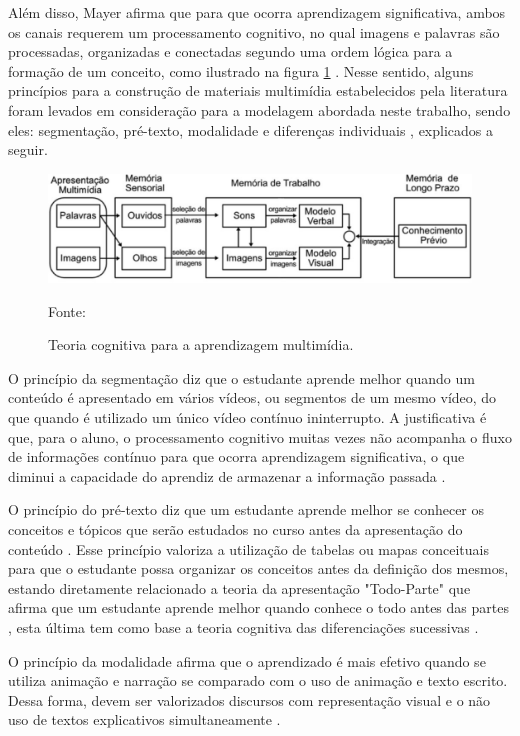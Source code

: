 Além disso, Mayer afirma que para que ocorra aprendizagem significativa, ambos os canais requerem um processamento cognitivo, no qual imagens e palavras são processadas, organizadas e conectadas segundo uma ordem lógica para a formação de um conceito, como ilustrado na figura \ref{fig:aprendizado} \cite{mayer2001, moreno2000}. Nesse sentido, alguns princípios para a construção de materiais multimídia estabelecidos pela literatura foram levados em consideração para a modelagem abordada neste trabalho, sendo eles: segmentação, pré-texto, modalidade e diferenças individuais \cite{clark2011, mayer2001, moreno2000}, explicados a seguir.

\begin{figure}[h!]
	\centering
  	\includegraphics[width=.9\linewidth]{figuras/aprendizado.eps}
  	\caption{Teoria cognitiva para a aprendizagem multimídia.}
  	\small{Fonte: \cite{moreno2000}}
  	\label{fig:aprendizado}
\end{figure}

O princípio da segmentação diz que o estudante aprende melhor quando um conteúdo é apresentado em vários vídeos, ou segmentos de um mesmo vídeo, do que quando é utilizado um único vídeo contínuo ininterrupto. A justificativa é que, para o aluno, o processamento cognitivo muitas vezes não acompanha o fluxo de informações contínuo para que ocorra aprendizagem significativa, o que diminui a capacidade do aprendiz de armazenar a informação passada \cite{mayer2001, moreno2000}.

O princípio do pré-texto diz que um estudante aprende melhor se conhecer os conceitos e tópicos que serão estudados no curso antes da apresentação do conteúdo \cite{clark2011}. Esse princípio valoriza a utilização de tabelas ou mapas conceituais para que o estudante possa organizar os conceitos antes da definição dos mesmos, estando diretamente relacionado a teoria da apresentação "Todo-Parte" que afirma que um estudante aprende melhor quando conhece o todo antes das partes \cite{mayer2014, mayer2001}, esta última tem como base a teoria cognitiva das diferenciações sucessivas \cite{ausubel2000}.

O princípio da modalidade afirma que o aprendizado é mais efetivo quando se utiliza animação e narração se comparado com o uso de animação e texto escrito. Dessa forma, devem ser valorizados discursos com representação visual e o não uso de textos explicativos simultaneamente \cite{mayer2014}.

